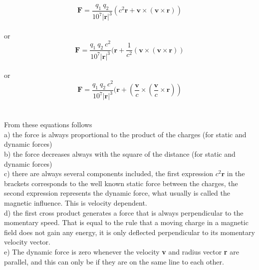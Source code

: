 \documentclass[10pt,titlepage]{article}
\begin{document}
\begin{equation}
\textbf{F} = \frac{q_1 \ q_2}{10^7\vert\textbf{r}\vert^3}  (c^2\textbf{r}+\textbf{v} \times ({\textbf{v} \times  \textbf{r}}))
\end{equation}\\
or
\begin{equation}
\textbf{F} = \frac{q_1 \ q_2 \ c^2}{10^7\vert\textbf{r}\vert^3}  (\textbf{r}+\frac{1}{c^2}(\textbf{v}\times( {\textbf{v} \times  \textbf{r}}))
\end{equation}
\\
or
\begin{equation}
\textbf{F} = \frac{q_1 \ q_2 \ c^2}{10^7\vert\textbf{r}\vert^3}  (\textbf{r}+(\frac{\textbf{v}}{c}\times( {\frac{\textbf{v}}{c}    \times {\textbf{r}}}))
\end{equation}
\\\\
From these equations follows
\\a) the force is always proportional to the product of the charges (for static and dynamic forces)
\\b) the force decreases always with the square of the distance (for static and dynamic forces)
\\c) there are always several components included, the first expression $c^2\textbf{r}$ in the brackets corresponds to the well known static force between the charges, the second expression represents the dynamic force, what usually is called the magnetic influence. This is velocity dependent. 
\\d) the first cross product generates a force that is always perpendicular to the momentary speed. That is equal to the rule that a moving charge in a magnetic field does not gain any energy, it is only deflected perpendicular to its momentary velocity vector.
\\e) The dynamic force is zero whenever the velocity \textbf{v } and radius vector \textbf{r } are parallel, and this can only be if they are on the same line to each other.
\\\\
\end{document}
